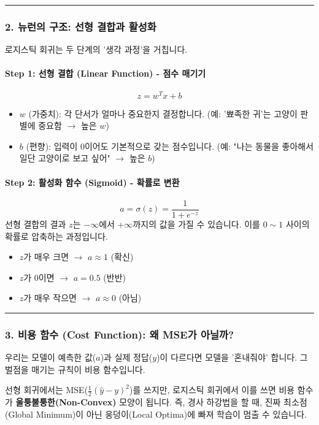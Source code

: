 \documentclass[11pt,a4paper]{book}
\theoremstyle{definition}
\begin{document}
\vspace{0.5cm}\hrule\vspace{0.5cm}

\subsubsection{2. 뉴런의 구조: 선형 결합과 활성화}
로지스틱 회귀는 두 단계의 '생각 과정'을 거칩니다.

\paragraph{Step 1: 선형 결합 (Linear Function) - 점수 매기기}
$$z = w^T x + b$$
\begin{itemize}
    \item $w$ (가중치): 각 단서가 얼마나 중요한지 결정합니다. (예: '뾰족한 귀'는 고양이 판별에 중요함 $\to$ 높은 $w$)
    \item $b$ (편향): 입력이 0이어도 기본적으로 갖는 점수입니다. (예: "나는 동물을 좋아해서 일단 고양이로 보고 싶어" $\to$ 높은 $b$)
\end{itemize}

\paragraph{Step 2: 활성화 함수 (Sigmoid) - 확률로 변환}
$$a = \sigma(z) = \frac{1}{1 + e^{-z}}$$
선형 결합의 결과 $z$는 $-\infty$에서 $+\infty$까지의 값을 가질 수 있습니다. 이를 $0 \sim 1$ 사이의 확률로 압축하는 과정입니다.

\begin{itemize}
    \item $z$가 매우 크면 $\to$ $a \approx 1$ (확신)
    \item $z$가 0이면 $\to$ $a = 0.5$ (반반)
    \item $z$가 매우 작으면 $\to$ $a \approx 0$ (아님)
\end{itemize}

\vspace{0.5cm}\hrule\vspace{0.5cm}

\subsubsection{3. 비용 함수 (Cost Function): 왜 MSE가 아닐까?}
우리는 모델이 예측한 값($a$)과 실제 정답($y$)이 다르다면 모델을 '혼내줘야' 합니다. 그 벌점을 매기는 규칙이 비용 함수입니다.

\begin{warningbox}[title={MSE(평균 제곱 오차)를 쓰면 안 되나요?}]
선형 회귀에서는 MSE($\frac{1}{2}(\hat{y}-y)^2$)를 쓰지만, 로지스틱 회귀에서 이를 쓰면 비용 함수가 \textbf{울퉁불퉁한(Non-Convex)} 모양이 됩니다.
즉, 경사 하강법을 할 때, 진짜 최소점(Global Minimum)이 아닌 웅덩이(Local Optima)에 빠져 학습이 멈출 수 있습니다.
\end{warningbox}
\end{document}
